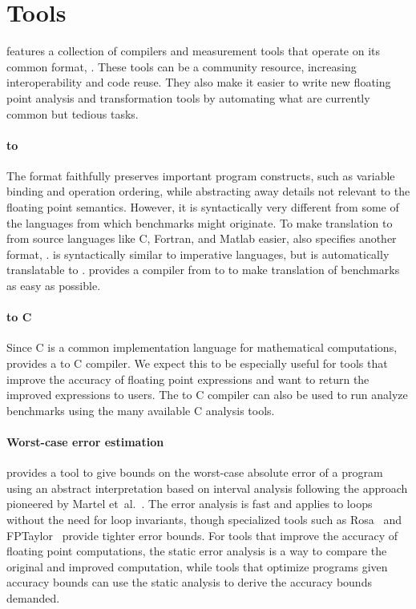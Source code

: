 \documentclass[main.tex]{subfiles}
\begin{document}
\section{Tools}
\label{sec:tools}

\name features
  a collection of compilers and measurement tools
  that operate on its common format, \core.
These tools can be a community resource,
  increasing interoperability and code reuse.
They also make it easier to write
  new floating point analysis and transformation tools
  by automating what are currently
  common but tedious tasks.

\paragraph{\surface to \core}
The \core format faithfully preserves important program constructs,
  such as variable binding and operation ordering,
  while abstracting away details not relevant
  to the floating point semantics.
However, it is syntactically very different
  from some of the languages from which benchmarks might originate.
To make translation to \core from source languages
  like C, Fortran, and Matlab easier,
  \name also specifies another format,
  \surface.
\surface is syntactically similar to imperative languages,
  but is automatically translatable to \core.
\name provides a compiler from \surface to \core
  to make translation of benchmarks as easy as possible.

\paragraph{\core to C}
Since C is a common implementation language for mathematical computations,
  \name provides a \core to C compiler.
We expect this to be especially useful for tools
  that improve the accuracy of floating point expressions
  and want to return the improved expressions to users.
The \core to C compiler can also be used
  to run analyze \name benchmarks
  using the many available C analysis tools.

\paragraph{Worst-case error estimation}
\name provides a tool to give bounds on
  the worst-case absolute error of a \core program
  using an abstract interpretation based on interval analysis
  following the approach pioneered by Martel et~al.~\cite{martel-ai}.
The error analysis is fast
  and applies to loops without the need for loop invariants,
  though specialized tools such as Rosa~\cite{DarulovaK14}
  and FPTaylor~\cite{fptaylor-fm15}
  provide tighter error bounds.
For tools that improve the accuracy of floating point computations,
  the static error analysis is a way to compare
  the original and improved computation,
  while tools that optimize programs given accuracy bounds
  can use the static analysis to derive the accuracy bounds demanded.
\end{document}
